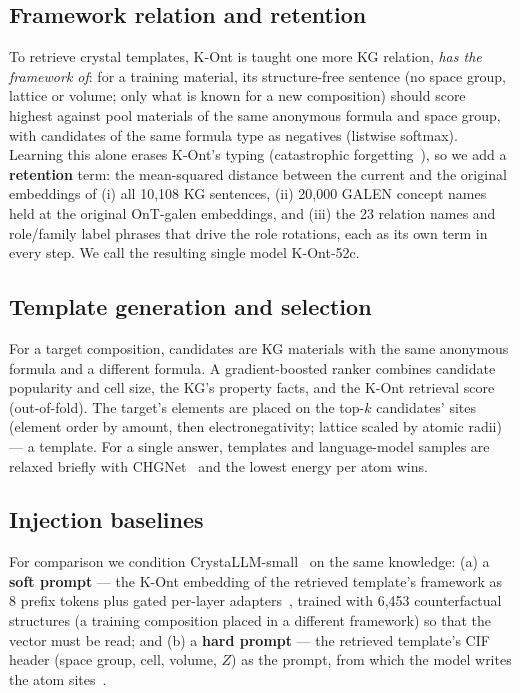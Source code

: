 \documentclass[conference]{IEEEtran}
\begin{document}
\subsection{Framework relation and retention}
To retrieve crystal templates, K-Ont is taught one more KG relation, \emph{has the framework of}: for a training material, its structure-free sentence (no space group, lattice or volume; only what is known for a new composition) should score highest against pool materials of the same anonymous formula and space group, with candidates of the same formula type as negatives (listwise softmax). Learning this alone erases K-Ont's typing (catastrophic forgetting~\cite{kirkpatrick2017ewc}), so we add a \textbf{retention} term: the mean-squared distance between the current and the original embeddings of (i) all 10,108 KG sentences, (ii) 20,000 GALEN concept names held at the original OnT-galen embeddings, and (iii) the 23 relation names and role/family label phrases that drive the role rotations, each as its own term in every step. We call the resulting single model K-Ont-52c.

\subsection{Template generation and selection}
For a target composition, candidates are KG materials with the same anonymous formula and a different formula. A gradient-boosted ranker combines candidate popularity and cell size, the KG's property facts, and the K-Ont retrieval score (out-of-fold). The target's elements are placed on the top-$k$ candidates' sites (element order by amount, then electronegativity; lattice scaled by atomic radii) --- a template. For a single answer, templates and language-model samples are relaxed briefly with CHGNet~\cite{deng2023chgnet} and the lowest energy per atom wins.

\subsection{Injection baselines}
For comparison we condition CrystaLLM-small~\cite{antunes2024crystallm} on the same knowledge: (a) a \textbf{soft prompt} --- the K-Ont embedding of the retrieved template's framework as 8 prefix tokens plus gated per-layer adapters~\cite{li2021prefix}, trained with 6,453 counterfactual structures (a training composition placed in a different framework) so that the vector must be read; and (b) a \textbf{hard prompt} --- the retrieved template's CIF header (space group, cell, volume, $Z$) as the prompt, from which the model writes the atom sites~\cite{lewis2020rag}.
\end{document}
